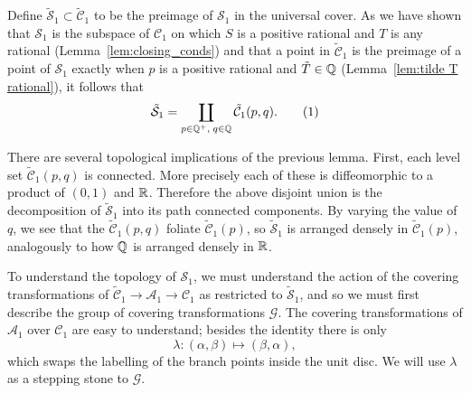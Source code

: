 Define $\mathcal{\tilde{S}}_1 \subset \mathcal{\tilde{C}}_1$ to be the preimage of $\mathcal{S}_1$ in the universal cover. As we have shown that $\mathcal{S}_1$ is the subspace of $\mathcal{C}_1$ on which $S$ is a positive rational and $T$ is any rational (Lemma~\ref{lem:closing_conds}) and that a point in $\mathcal{\tilde{C}}_1$ is the preimage of a point of $\mathcal{S}_1$ exactly when $p$ is a positive rational and $\tilde{T} \in \Q$ (Lemma~\ref{lem:tilde T rational}), it follows that
\[
\mathcal{\tilde{S}}_1 = \coprod_{p\in \Q^+,\; q\in \Q} \mathcal{\tilde{C}}_1(p,q).
\labelthis{eqn:def tilde S}
\]

There are several topological implications of the previous lemma. First, each level set $\mathcal{\tilde{C}}_1(p,q)$ is connected. More precisely each of these is diffeomorphic to a product of $(0,1)$ and $\R$. Therefore the above disjoint union is the decomposition of $\mathcal{\tilde{S}}_1$ into its path connected components. By varying the value of $q$, we see that the $\mathcal{\tilde{C}}_1(p,q)$ foliate $\mathcal{\tilde{C}}_1(p)$, so $\mathcal{\tilde{S}}_1$ is arranged densely in $\mathcal{\tilde{C}}_1(p)$, analogously to how $\Q$ is arranged densely in $\R$.

To understand the topology of $\mathcal{S}_1$, we must understand the action of the covering transformations of $\mathcal{\tilde{C}}_1 \to \mathcal{A}_1 \to \mathcal{C}_1$ as restricted to $\tilde{\mathcal{S}}_1$, and so we must first describe the group of covering transformations $\mathcal{G}$. The covering transformations of $\mathcal{A}_1$ over $\mathcal{C}_1$ are easy to understand; besides the identity there is only
\[
λ : (α,β) \mapsto (β,α),
\]
which swaps the labelling of the branch points inside the unit disc. We will use $λ$ as a stepping stone to $\mathcal{G}$.




